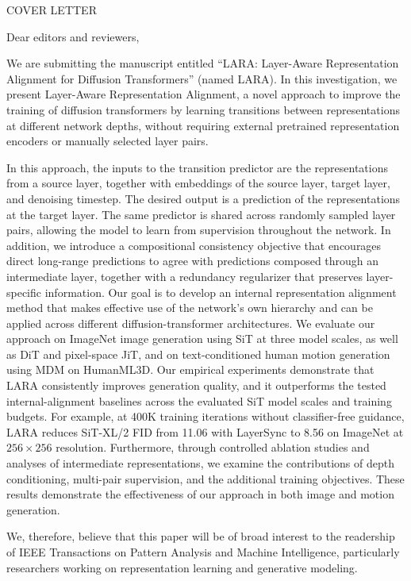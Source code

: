 \documentclass[12pt,a4paper]{article}
\newcommand{\highlight}[1]{\textcolor{letterpurple}{#1}}
\begin{document}
\begin{center}
COVER LETTER
\end{center}
\vspace{2pt}

Dear editors and reviewers,

We are submitting the manuscript entitled ``\highlight{LARA: Layer-Aware Representation Alignment for Diffusion Transformers}'' (named LARA). In this investigation, we present Layer-Aware Representation Alignment, a novel approach to improve the training of diffusion transformers by learning transitions between representations at different network depths, without requiring external pretrained representation encoders or manually selected layer pairs.

In this approach, the inputs to the transition predictor are the representations from a source layer, together with embeddings of the source layer, target layer, and denoising timestep. The desired output is a prediction of the representations at the target layer. The same predictor is shared across randomly sampled layer pairs, allowing the model to learn from supervision throughout the network. In addition, we introduce a compositional consistency objective that encourages direct long-range predictions to agree with predictions composed through an intermediate layer, together with a redundancy regularizer that preserves layer-specific information. Our goal is to develop an internal representation alignment method that makes effective use of the network's own hierarchy and can be applied across different diffusion-transformer architectures. We evaluate our approach on ImageNet image generation using SiT at three model scales, as well as DiT and pixel-space JiT, and on text-conditioned human motion generation using MDM on HumanML3D. Our empirical experiments demonstrate that LARA consistently improves generation quality, and \highlight{it outperforms the tested internal-alignment baselines across the evaluated SiT model scales and training budgets}. For example, at 400K training iterations without classifier-free guidance, LARA reduces SiT-XL/2 FID from 11.06 with LayerSync to 8.56 on ImageNet at $256\times256$ resolution. Furthermore, through controlled ablation studies and analyses of intermediate representations, we examine the contributions of depth conditioning, multi-pair supervision, and the additional training objectives. These results demonstrate the effectiveness of our approach in both image and motion generation.

We, therefore, believe that this paper will be of broad interest to the readership of \highlight{IEEE Transactions on Pattern Analysis and Machine Intelligence}, particularly researchers working on representation learning and generative modeling.
\end{document}
